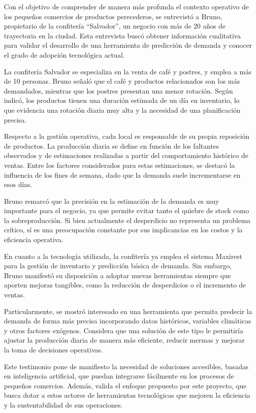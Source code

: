 Con el objetivo de comprender de manera más profunda el contexto operativo de los pequeños comercios de productos perecederos, se entrevistó a Bruno, propietario de la confitería ``Salvador'', un negocio con más de 20 años de trayectoria en la ciudad. Esta entrevista buscó obtener información cualitativa para validar el desarrollo de una herramienta de predicción de demanda y conocer el grado de adopción tecnológica actual.

La confitería Salvador se especializa en la venta de café y postres, y emplea a más de 10 personas. Bruno señaló que el café y productos relacionados son los más demandados, mientras que los postres presentan una menor rotación. Según indicó, los productos tienen una duración estimada de un día en inventario, lo que evidencia una rotación diaria muy alta y la necesidad de una planificación precisa.

Respecto a la gestión operativa, cada local es responsable de su propia reposición de productos. La producción diaria se define en función de los faltantes observados y de estimaciones realizadas a partir del comportamiento histórico de ventas. Entre los factores considerados para estas estimaciones, se destacó la influencia de los fines de semana, dado que la demanda suele incrementarse en esos días.

Bruno remarcó que la precisión en la estimación de la demanda es muy importante para el negocio, ya que permite evitar tanto el quiebre de stock como la sobreproducción. Si bien actualmente el desperdicio no representa un problema crítico, sí es una preocupación constante por sus implicancias en los costos y la eficiencia operativa.

En cuanto a la tecnología utilizada, la confitería ya emplea el sistema Maxirest para la gestión de inventario y predicción básica de demanda. Sin embargo, Bruno manifestó su disposición a adoptar nuevas herramientas siempre que aporten mejoras tangibles, como la reducción de desperdicios o el incremento de ventas.

Particularmente, se mostró interesado en una herramienta que permita predecir la demanda de forma más precisa incorporando datos históricos, variables climáticas y otros factores exógenos. Considera que una solución de este tipo le permitiría ajustar la producción diaria de manera más eficiente, reducir mermas y mejorar la toma de decisiones operativas.

Este testimonio pone de manifiesto la necesidad de soluciones accesibles, basadas en inteligencia artificial, que puedan integrarse fácilmente en los procesos de pequeños comercios. Además, valida el enfoque propuesto por este proyecto, que busca dotar a estos actores de herramientas tecnológicas que mejoren la eficiencia y la sustentabilidad de sus operaciones.


